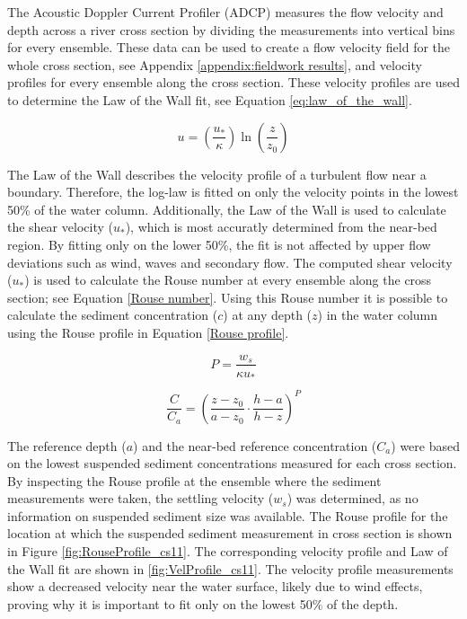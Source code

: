 The Acoustic Doppler Current Profiler (ADCP) measures the flow velocity and depth across a river cross section by dividing the measurements into vertical bins for every ensemble. These data can be used to create a flow velocity field for the whole cross section, see Appendix \ref{appendix:fieldwork results}, and velocity profiles for every ensemble along the cross section. These velocity profiles are used to determine the Law of the Wall fit, see Equation \ref{eq:law_of_the_wall}.

\begin{equation}
    u = \left( \frac{u_*}{\kappa} \right) \ln\left( \frac{z}{z_0} \right)
    \label{eq:law_of_the_wall}
\end{equation}

The Law of the Wall describes the velocity profile of a turbulent flow near a boundary. Therefore, the log-law is fitted on only the velocity points in the lowest 50\% of the water column. Additionally, the Law of the Wall is used to calculate the shear velocity ($u_*$), which is most accuratly determined from the near-bed region. By fitting only on the lower 50\%, the fit is not affected by upper flow deviations such as wind, waves and secondary flow. The computed shear velocity ($u_*$) is used to calculate the Rouse number at every ensemble along the cross section; see Equation \ref{Rouse number}. Using this Rouse number it is possible to calculate the sediment concentration ($c$) at any depth ($z$) in the water column using the Rouse profile in Equation \ref{Rouse profile}.

\begin{equation}
    P = \frac{w_s}{\kappa u_*}
    \label{Rouse number}
\end{equation}

\begin{equation}
    \frac{C}{C_a} = \left( \frac{z - z_0}{a - z_0} \cdot \frac{h - a}{h - z} \right)^{P}
    \label{Rouse profile}
\end{equation}

The reference depth ($a$) and the near-bed reference concentration ($C_a$) were based on the lowest suspended sediment concentrations measured for each cross section. By inspecting the Rouse profile at the ensemble where the sediment measurements were taken, the settling velocity ($w_s$) was determined, as no information on suspended sediment size was available. The Rouse profile for the location at which the suspended sediment measurement in cross section is shown in Figure \ref{fig:RouseProfile_cs11}. The corresponding velocity profile and Law of the Wall fit are shown in \ref{fig:VelProfile_cs11}. The velocity profile measurements show a decreased velocity near the water surface, likely due to wind effects, proving why it is important to fit only on the lowest 50\% of the depth.

